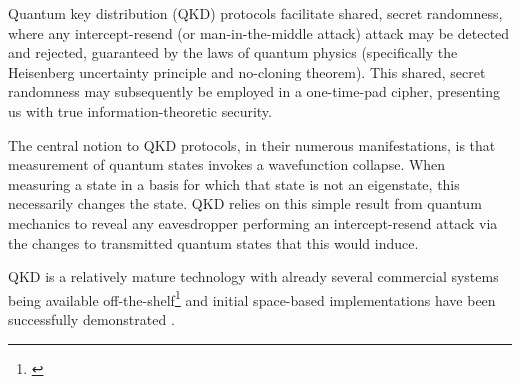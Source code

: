 

Quantum key distribution (QKD) protocols facilitate shared, secret randomness, where any intercept-resend (or man-in-the-middle attack) attack may be detected and rejected, guaranteed by the laws of quantum physics (specifically the Heisenberg uncertainty principle and no-cloning theorem). This shared, secret randomness may subsequently be employed in a one-time-pad cipher, presenting us with true information-theoretic security.

The central notion to QKD protocols, in their numerous manifestations, is that measurement of quantum states invokes a wavefunction collapse. When measuring a state in a basis for which that state is not an eigenstate, this necessarily changes the state. QKD relies on this simple result from quantum mechanics to reveal any eavesdropper performing an intercept-resend attack via the changes to transmitted quantum states that this would induce.

QKD is a relatively mature technology with already several commercial systems being available off-the-shelf\footnote{\cite{??? example companies}} and initial space-based implementations have been successfully demonstrated \cite{Pan}.

